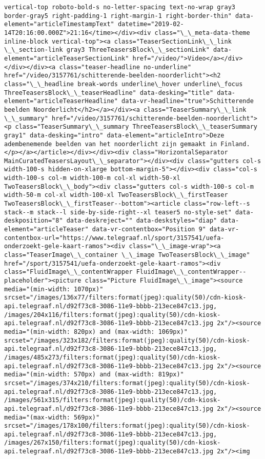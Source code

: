 \documentclass[11pt]{article}
\begin{document}
\begin{Verbatim}[commandchars=\\\{\}]
vertical-top roboto-bold-s no-letter-spacing text-no-wrap gray3 border-gray5 right-padding-1 right-margin-1 right-border-thin" data-element="articleTimestampText" datetime="2019-02-14T20:16:00.000Z">21:16</time></div><div class="\_\_meta-data-theme inline-block vertical-top"><a class="TeaserSectionLink\_\_link \_\_section-link gray3 ThreeTeasersBlock\_\_sectionLink" data-element="articleTeaserSectionLink" href="/video/">Video</a></div></div></div><a class="teaser-headline no-underline" href="/video/3157761/schitterende-beelden-noorderlicht"><h2 class="\_\_headline break-words underline\_hover underline\_focus ThreeTeasersBlock\_\_teaserHeadline" data-desking="title" data-element="articleTeaserHeadline" data-vr-headline="true">Schitterende beelden Noorderlicht</h2></a></div><a class="TeaserSummary\_\_link \_\_summary" href="/video/3157761/schitterende-beelden-noorderlicht"><p class="TeaserSummary\_\_summary ThreeTeasersBlock\_\_teaserSummary gray1" data-desking="intro" data-element="articleIntro">Deze adembenemende beelden van het noorderlicht zijn gemaakt in Finland.</p></a></article></div></div><div class="HorizontalSeparator MainCuratedTeasersLayout\_\_separator"></div><div class="gutters col-s width-100-s hidden-on-xlarge bottom-margin-5"></div><div class="col-s width-100-s col-m width-100-m col-xl width-50-xl TwoTeasersBlock\_\_body"><div class="gutters col-s width-100-s col-m width-50-m col-xl width-100-xl TwoTeasersBlock\_\_firstTeaser TwoTeasersBlock\_\_firstTeaser--bottom"><article class="row-left--s stack--m stack--l side-by-side-right--xl teaser5 no-style-set" data-deskposition="8" data-deskreject="" data-deskstyles="diap" data-element="articleTeaser" data-vr-contentbox="Position 9" data-vr-contentbox-url="https://www.telegraaf.nl/sport/3157541/uefa-onderzoekt-gele-kaart-ramos"><div class="\_\_image-wrap"><a class="TeaserImage\_\_container \_\_image TwoTeasersBlock\_\_image" href="/sport/3157541/uefa-onderzoekt-gele-kaart-ramos"><div class="FluidImage\_\_contentWrapper FluidImage\_\_contentWrapper--placeholder"><picture class="Picture FluidImage\_\_image"><source media="(min-width: 1070px)" srcset="/images/136x77/filters:format(jpeg):quality(50)/cdn-kiosk-api.telegraaf.nl/d92f73c8-3086-11e9-bbbb-213ece847c13.jpg, /images/204x116/filters:format(jpeg):quality(50)/cdn-kiosk-api.telegraaf.nl/d92f73c8-3086-11e9-bbbb-213ece847c13.jpg 2x"/><source media="(min-width: 820px) and (max-width: 1069px)" srcset="/images/323x182/filters:format(jpeg):quality(50)/cdn-kiosk-api.telegraaf.nl/d92f73c8-3086-11e9-bbbb-213ece847c13.jpg, /images/485x273/filters:format(jpeg):quality(50)/cdn-kiosk-api.telegraaf.nl/d92f73c8-3086-11e9-bbbb-213ece847c13.jpg 2x"/><source media="(min-width: 570px) and (max-width: 819px)" srcset="/images/374x210/filters:format(jpeg):quality(50)/cdn-kiosk-api.telegraaf.nl/d92f73c8-3086-11e9-bbbb-213ece847c13.jpg, /images/561x315/filters:format(jpeg):quality(50)/cdn-kiosk-api.telegraaf.nl/d92f73c8-3086-11e9-bbbb-213ece847c13.jpg 2x"/><source media="(max-width: 569px)" srcset="/images/178x100/filters:format(jpeg):quality(50)/cdn-kiosk-api.telegraaf.nl/d92f73c8-3086-11e9-bbbb-213ece847c13.jpg, /images/267x150/filters:format(jpeg):quality(50)/cdn-kiosk-api.telegraaf.nl/d92f73c8-3086-11e9-bbbb-213ece847c13.jpg 2x"/><img 
\end{Verbatim}
\end{document}
